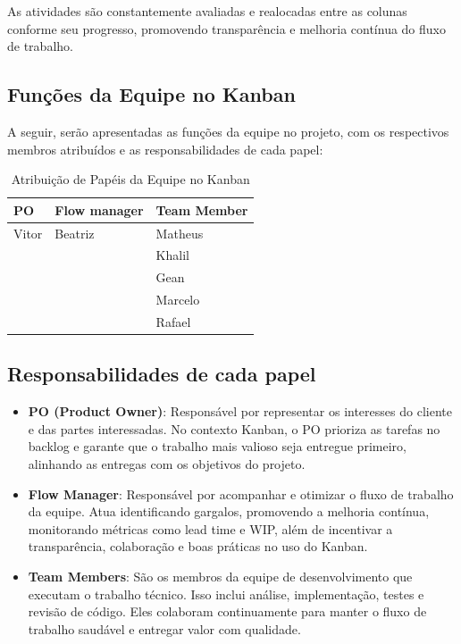 \documentclass[
	12pt,				%
	openany,			%
	twoside,			%
	a4paper,			%
	english,			%
	brazil				%
	]{abntex2}
\begin{document}
As atividades são constantemente avaliadas e realocadas entre as colunas conforme seu progresso, promovendo transparência e melhoria contínua do fluxo de trabalho.

\subsection{Funções da Equipe no Kanban}

A seguir, serão apresentadas as funções da equipe no projeto, com os respectivos membros atribuídos e as responsabilidades de cada papel:

\begin{table}[htbp]
\centering
\begin{tabular}{|l|l|l|}
\hline
\textbf{PO} & \textbf{Flow manager} & \textbf{Team Member} \\ \hline
Vitor        & Beatriz      & Matheus             \\ \hline
             &              & Khalil         \\ \hline
             &              & Gean                \\ \hline
             &              & Marcelo             \\ \hline
             &              & Rafael              \\ \hline
\end{tabular}
\caption{Atribuição de Papéis da Equipe no Kanban}
\end{table}

\FloatBarrier

\subsection{Responsabilidades de cada papel}

\begin{itemize}
    \item \textbf{PO (Product Owner)}: 
    Responsável por representar os interesses do cliente e das partes interessadas. No contexto Kanban, o PO prioriza as tarefas no backlog e garante que o trabalho mais valioso seja entregue primeiro, alinhando as entregas com os objetivos do projeto.
    
    \item \textbf{Flow Manager}: 
    Responsável por acompanhar e otimizar o fluxo de trabalho da equipe. Atua identificando gargalos, promovendo a melhoria contínua, monitorando métricas como lead time e WIP, além de incentivar a transparência, colaboração e boas práticas no uso do Kanban.
    
    \item \textbf{Team Members}: 
    São os membros da equipe de desenvolvimento que executam o trabalho técnico. Isso inclui análise, implementação, testes e revisão de código. Eles colaboram continuamente para manter o fluxo de trabalho saudável e entregar valor com qualidade.
\end{itemize}
\end{document}

